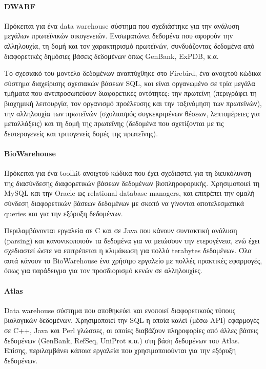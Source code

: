             \paragraph{DWARF}
                Πρόκειται για ένα data warehouse σύστημα που σχεδιάστηκε για την ανάλυση μεγάλων πρωτεϊνικών οικογενειών.
                Ενσωματώνει δεδομένα που αφορούν την αλληλουχία, τη δομή και τον χαρακτηρισμό πρωτεϊνών, συνδυάζοντας δεδομένα από διαφορετικές δημόσιες βάσεις δεδομένων όπως GenBank, ExPDB, κ.α.

                Το σχεσιακό του μοντέλο δεδομένων αναπτύχθηκε στο Firebird, ένα ανοιχτού κώδικα σύστημα διαχείρισης σχεσιακών βάσεων SQL, και είναι οργανωμένο σε τρία μεγάλα τμήματα που αντιπροσωπεύουν διαφορετικές οντότητες:
                    την πρωτεΐνη (περιγράφει τη βιοχημική λειτουργία, τον οργανισμό προέλευσης και την ταξινόμηση των πρωτεϊνών), την αλληλουχία των πρωτεϊνών (σχολιασμός συγκεκριμένων θέσεων,
                        λεπτομέρειες για μεταλλάξεις) και τη δομή της πρωτεΐνης (δεδομένα που σχετίζονται με τις δευτερογενείς και τριτογενείς δομές της πρωτεΐνης). \cite{DWARF}

            \paragraph{BioWarehouse}
                Πρόκειται για ένα toolkit ανοιχτού κώδικα που έχει σχεδιαστεί για τη διευκόλυνση της διασύνδεσης διαφορετικών βάσεων δεδομένων βιοπληροφορικής.
                Χρησιμοποιεί τη MySQL και την Oracle ως relational database managers, και επιτρέπει την ομαλή σύνδεση διαφορετικών βάσεων δεδομένων με σκοπό να γίνονται αποτελεσματικά queries και για την εξόρυξη δεδομένων. \cite{BioWarehouse}

                Περιλαμβάνονται εργαλεία σε C και σε Java που κάνουν συντακτική ανάλυση (parsing) και κανονικοποιούν τα δεδομένα για να μειώσουν την ετερογένεια, ενώ έχει σχεδιαστεί ώστε να επιτρέπεται η κλιμάκωση για πολλά terabytes δεδομένων.
                Όλα αυτά κάνουν το BioWarehouse ένα χρήσιμο εργαλείο με πολλές πρακτικές εφαρμογές, όπως για παράδειγμα για τον προσδιορισμό κενών σε αλληλουχίες.

            \paragraph{Atlas}
                Data warehouse σύστημα που αποθηκεύει και ενοποιεί διαφορετικούς τύπους βιολογικών δεδομένων.
                Χρησιμοποιεί την SQL η οποία καλεί (μέσω API) εφαρμογές σε C++, Java και Perl γλώσσες, οι οποίες διαβάζουν πληροφορίες από άλλες βάσεις δεδομένων (GenBank, RefSeq, UniProt κ.α.) στη βάση δεδομένων του Atlas.
                Επίσης, περιλαμβάνει κάποια εργαλεία που χρησιμοποιούνται για την εξόρυξη δεδομένων. \cite{Atlas}

